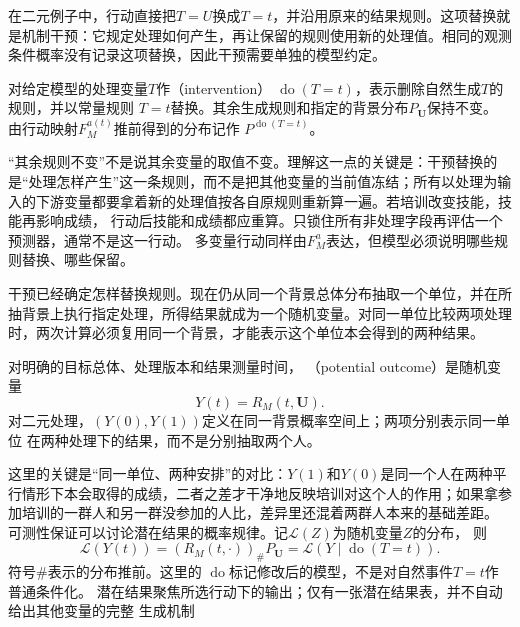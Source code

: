 在二元例子中，行动直接把\(T=U\)换成\(T=t\)，并沿用原来的结果规则。这项替换就是机制干预：它规定处理如何产生，再让保留的规则使用新的处理值。相同的观测条件概率没有记录这项替换，因此干预需要单独的模型约定。

\begin{definition}[理想干预]
  \label{def:causal-intervention}
  对给定模型的处理变量\(T\)作（intervention）
  \(\operatorname{do}(T=t)\)，表示删除自然生成\(T\)的规则，并以常量规则
  \(T=t\)替换。其余生成规则和指定的背景分布\(P_{\bm U}\)保持不变。
  由行动映射\(F_M^{a(t)}\)推前得到的分布记作
  \(P^{\operatorname{do}(T=t)}\)。
\end{definition}

“其余规则不变”不是说其余变量的取值不变。理解这一点的关键是：干预替换的是“处理怎样产生”这一条规则，而不是把其他变量的当前值冻结；所有以处理为输入的下游变量都要拿着新的处理值按各自原规则重新算一遍。若培训改变技能，技能再影响成绩，
行动后技能和成绩都应重算。只锁住所有非处理字段再评估一个预测器，通常不是这一行动。
多变量行动同样由\(F_M^a\)表达，但模型必须说明哪些规则替换、哪些保留。

干预已经确定怎样替换规则。现在仍从同一个背景总体分布抽取一个单位，并在所抽背景上执行指定处理，所得结果就成为一个随机变量。对同一单位比较两项处理时，两次计算必须复用同一个背景，才能表示这个单位本会得到的两种结果。
\begin{definition}[潜在结果]
  \label{def:causal-potential-outcomes}
  对明确的目标总体、处理版本和结果测量时间，
  （potential outcome）是随机变量
  \begin{equation}
    Y(t)=R_M(t,\bm U).
    \label{eq:causal-response-potential-outcome}
  \end{equation}
  对二元处理，\((Y(0),Y(1))\)定义在同一背景概率空间上；两项分别表示同一单位
  在两种处理下的结果，而不是分别抽取两个人。
\end{definition}

这里的关键是“同一单位、两种安排”的对比：\(Y(1)\)和\(Y(0)\)是同一个人在两种平行情形下本会取得的成绩，二者之差才干净地反映培训对这个人的作用；如果拿参加培训的一群人和另一群没参加的人比，差异里还混着两群人本来的基础差距。
可测性保证可以讨论潜在结果的概率规律。记\(\mathcal L(Z)\)为随机变量\(Z\)的分布，
则
\[
  \mathcal L(Y(t))
  =
  (R_M(t,\cdot))_{\#}P_{\bm U}
  =
  \mathcal L(Y\mid\operatorname{do}(T=t)).
\]
符号\(\#\)表示的分布推前。这里的
\(\operatorname{do}\)标记修改后的模型，不是对自然事件\(T=t\)作普通条件化。
潜在结果聚焦所选行动下的输出；仅有一张潜在结果表，并不自动给出其他变量的完整
生成机制

